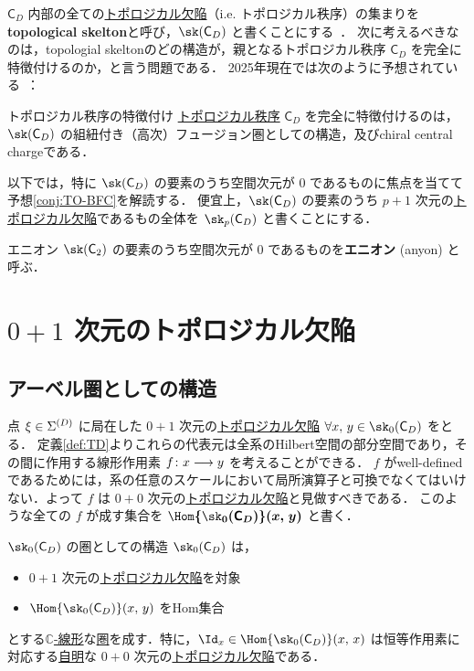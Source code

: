 \documentclass[TQFT_main]{subfiles}
\begin{document}
$\mathsf{C}_D$ 内部の全ての\hyperref[def:TD]{トポロジカル欠陥}（i.e. トポロジカル秩序）の集まりを\textbf{topological skelton}と呼び，$\sk (\mathsf{C}_D)$ と書くことにする~\cite{KongZhang2022TO}．
次に考えるべきなのは，topologial skeltonのどの構造が，親となるトポロジカル秩序 $\mathsf{C}_D$ を完全に特徴付けるのか，と言う問題である．
2025年現在では次のように予想されている~\cite[Conjecture 2, p.11]{KongWen2014braidedfusioncategoriesgravitational}：

\begin{myconjph}[label=conj:TO-BFC]{トポロジカル秩序の特徴付け}
    \hyperref[def:quantum-phase]{トポロジカル秩序} $\mathsf{C}_D$ を完全に特徴付けるのは，$\sk (\mathsf{C}_D)$ の組紐付き（高次）フュージョン圏としての構造，及びchiral central chargeである．
\end{myconjph}

以下では，特に $\sk (\mathsf{C}_D)$ の要素のうち空間次元が $0$ であるものに焦点を当てて予想\eqref{conj:TO-BFC}を解読する．
便宜上，$\sk (\mathsf{C}_D)$ の要素のうち $p+1$ 次元の\hyperref[def:TD]{トポロジカル欠陥}であるもの全体を $\sk_p (\mathsf{C}_D)$ と書くことにする．

\begin{mydef}[label=def:anyon]{エニオン}
    $\sk (\mathsf{C}_2)$ の要素のうち空間次元が $0$ であるものを\textbf{エニオン} (anyon) と呼ぶ．
\end{mydef}

\section{$0+1$ 次元のトポロジカル欠陥}

\subsection{アーベル圏としての構造}

点 $\xi \in \Sigma^{(D)}$ に局在した $0+1$ 次元の\hyperref[def:TD]{トポロジカル欠陥} $\forall x,\, y \in \sk_0(\mathsf{C}_D)$ をとる．
定義\ref{def:TD}よりこれらの代表元は全系のHilbert空間の部分空間であり，その間に作用する線形作用素 $f \colon x \longrightarrow y$ を考えることができる．
$f$ がwell-definedであるためには，系の任意のスケールにおいて局所演算子と可換でなくてはいけない．よって $f$ は $0+0$ 次元の\hyperref[def:TD]{トポロジカル欠陥}と見做すべきである．
このような全ての $f$ が成す集合を $\bm{\Hom{\sk_0(\mathsf{C}_D)}(x,\, y)}$ と書く．

\begin{mypropph}[label=prop:sk0-category]{$\sk_0(\mathsf{C}_D)$ の圏としての構造}
    $\sk_0(\mathsf{C}_D)$ は，
    \begin{itemize}
        \item $0+1$ 次元の\hyperref[def:TD]{トポロジカル欠陥}を対象
        \item $\Hom{\sk_0(\mathsf{C}_D)}(x,\, y)$ をHom集合
    \end{itemize}
    とする\hyperref[def:additive-cat]{$\mathbb{C}$-線形}な\hyperref[def:category]{圏}を成す．特に，$\Id_x \in \Hom{\sk_0(\mathsf{C}_D)} (x,\, x)$ は恒等作用素に対応する\hyperref[def:trivialTO]{自明}な $0+0$ 次元の\hyperref[def:TD]{トポロジカル欠陥}である．
\end{mypropph}
\end{document}
